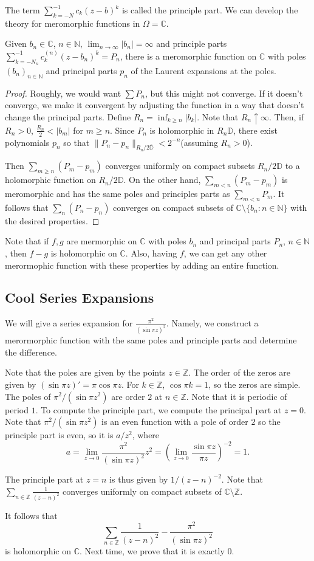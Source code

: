 \documentclass[12pt]{scrartcl}
\newcommand{\N}{\mathbb{N}}
\newcommand{\Z}{\mathbb{Z}}
\newcommand{\C}{\mathbb C}
\newcommand{\D}{\mathbb D}
\let \ol \overline
\begin{document}
The term $\sum_{k=-N}^{-1} c_k(z - b)^k$ is called the principle part.  We can develop the theory for meromorphic functions in $\Omega = \C$. 
\begin{theorem} Given $b_n \in \C$, $n \in \N$, $\lim_{n \to \infty} |b_n| = \infty$ and principle parts $\sum_{k = -N_n}^{-1} c_k^{(n)}(z - b_n)^k = P_n$, there is a meromorphic function on $\C$ with poles $(b_n)_{n \in \N}$ and principal parts $p_n$ of the Laurent expansions at the poles.
\end{theorem}
\begin{proof}
Roughly, we would want $\sum P_n$, but this might not converge.  If it doesn't converge, we make it convergent by adjusting the function in a way that doesn't change the principal parts.  Define $R_n = \inf_{k \ge n} |b_k|$.  Note that $R_n \uparrow \infty$.  Then, if $R_n > 0$, $\frac{R_n}{2} < |b_m|$ for $m \ge n$.  Since $P_n$ is holomorphic in $R_n\D$, there exist polynomials $p_n$ so that $\|P_n - p_n \|_{R_n/2 \ol{\D}} < 2^{-n}$(assuming $R_n > 0$).

Then $\sum_{m \ge n} (P_m - p_m)$ converges uniformly on compact subsets $R_n/2 \D$ to a holomorphic function on $R_n/2 \D$.  On the other hand, $\sum_{m < n} (P_m - p_m)$ is meromorphic and has the same poles and principles parts as $\sum_{m < n} P_m $.  It follows that $\sum_n (P_n - p_n)$ converges on compact subsets of $\C \setminus \{b_n : n \in \N\}$ with the desired properties.
\end{proof}
\begin{remark} Note that if $f, g$ are mermorphic on $\C$ with poles $b_n$ and principal parts $P_n$, $n \in \N$, then $f - g$ is holomorphic on $\C$.  Also, having $f$, we can get any other merormophic function with these properties by adding an entire function.
\end{remark}
\subsection{Cool Series Expansions}
We will give a series expansion for $\frac{\pi^2}{(\sin{\pi z})^2}$.  Namely, we construct a merormorphic function with the same poles and principle parts and determine the difference.  

Note that the poles are given by the points $z \in \Z$.  The order of the zeros are given by $(\sin{\pi z})' = \pi \cos{\pi z}$.  For $k \in \Z$, $\cos{\pi k} = 1$, so the zeros are simple.  The poles of $\pi^2/(\sin{\pi z}^2)$ are order $2$ at $n \in \Z$.  Note that it is periodic of period $1$.  To compute the principle part, we compute the principal part at $z = 0$.  Note that $\pi^2/(\sin{\pi z}^2)$ is an even function with a pole of order $2$ so the principle part is even, so it is $a/z^2$, where
$$a = \lim_{z \to 0} \frac{\pi^2}{(\sin{\pi z})^2} z^2 = (\lim_{z \to 0} \frac{\sin{\pi z}}{\pi z})^{-2} = 1.$$

The principle part at $z = n$ is thus given by $1/(z - n)^{-2}$.  Note that $\sum_{n \in \Z} \frac{1}{(z - n)^2}$ converges uniformly on compact subsets of $\C \setminus \Z$.   

It follows that 
$$\sum_{n \in \Z} \frac{1}{(z - n)^2} - \frac{\pi^2}{(\sin{\pi z})^2}$$
is holomorphic on $\C$.  Next time, we prove that it is exactly $0$.
\end{document}
